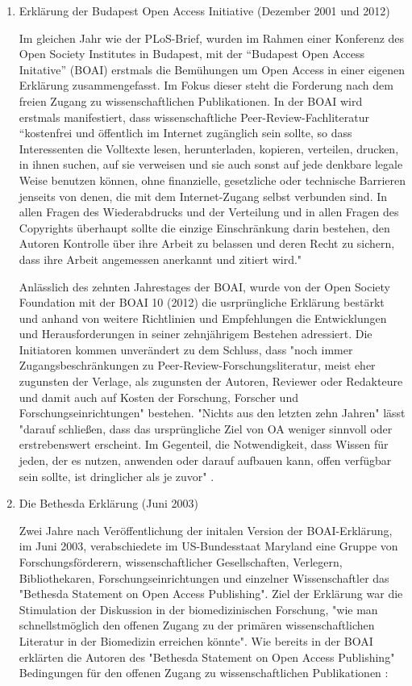 \begin{enumerate}
\item Erklärung der Budapest Open Access Initiative (Dezember 2001 und 2012)

Im gleichen Jahr wie der PLoS-Brief, wurden im Rahmen einer Konferenz des Open Society Institutes in Budapest, mit der “Budapest Open Access Initative” (BOAI)\cite{boai_2012} erstmals die Bemühungen um Open Access in einer eigenen Erklärung zusammengefasst\cite{cite:21a}. Im Fokus dieser steht die Forderung nach dem freien Zugang zu wissenschaftlichen Publikationen. In der BOAI wird erstmals manifestiert, dass wissenschaftliche Peer-Review-Fachliteratur “kostenfrei und öffentlich im Internet zugänglich sein sollte, so dass Interessenten die Volltexte lesen, herunterladen, kopieren, verteilen, drucken, in ihnen suchen, auf sie verweisen und sie auch sonst auf jede denkbare legale Weise benutzen können, ohne finanzielle, gesetzliche oder technische Barrieren jenseits von denen, die mit dem Internet-Zugang selbst verbunden sind. In allen Fragen des Wiederabdrucks und der Verteilung und in allen Fragen des Copyrights überhaupt sollte die einzige Einschränkung darin bestehen, den Autoren Kontrolle über ihre Arbeit zu belassen und deren Recht zu sichern, dass ihre Arbeit angemessen anerkannt und zitiert wird."\cite{boai_2012} 

Anlässlich des zehnten Jahrestages der BOAI, wurde von der Open Society Foundation mit der BOAI 10 (2012) die usrprüngliche Erklärung bestärkt und anhand von weitere Richtlinien und Empfehlungen die Entwicklungen und Herausforderungen in seiner zehnjährigem Bestehen adressiert. Die Initiatoren kommen unverändert zu dem Schluss, dass "noch immer Zugangsbeschränkungen zu Peer-Review-Forschungsliteratur, meist eher zugunsten der Verlage, als zugunsten der Autoren, Reviewer oder Redakteure und damit auch auf Kosten der Forschung, Forscher und Forschungseinrichtungen" \cite{boai_2012} bestehen. "Nichts aus den letzten zehn Jahren" lässt "darauf schließen, dass das ursprüngliche Ziel von OA weniger sinnvoll oder erstrebenswert erscheint. Im Gegenteil, die Notwendigkeit, dass Wissen für jeden, der es nutzen, anwenden oder darauf aufbauen kann, offen verfügbar sein sollte, ist dringlicher als je zuvor" \cite{boai_2012}.

\item Die Bethesda Erklärung (Juni 2003)

Zwei Jahre nach Veröffentlichung der initalen Version der BOAI-Erklärung, im Juni 2003, verabschiedete im US-Bundesstaat Maryland eine Gruppe von Forschungsförderern, wissenschaftlicher Gesellschaften, Verlegern, Bibliothekaren, Forschungseinrichtungen und einzelner Wissenschaftler das "Bethesda Statement on Open Access Publishing".\cite{suchen} Ziel der Erklärung war die Stimulation der Diskussion in der biomedizinischen Forschung, "wie man schnellstmöglich den offenen Zugang zu der primären wissenschaftlichen Literatur in der Biomedizin erreichen könnte"\cite{suchen}. Wie bereits in der BOAI erklärten die Autoren des "Bethesda Statement on Open Access Publishing" Bedingungen für den offenen Zugang zu wissenschaftlichen Publikationen \cite{suchen}: 


\end{enumerate}
